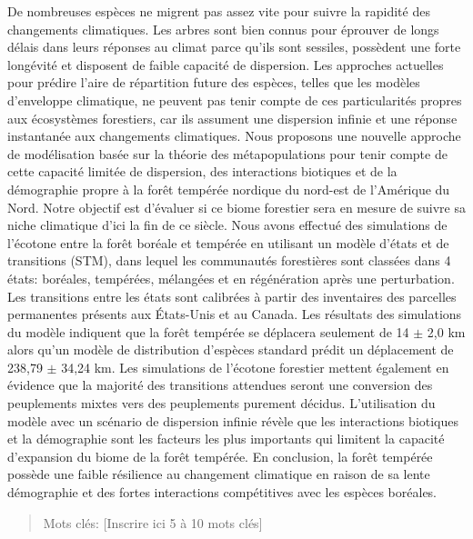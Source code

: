 \resume
\begin{singlespace}

  De nombreuses espèces ne migrent pas assez vite pour suivre la rapidité des changements
  climatiques. Les arbres sont bien connus pour éprouver de longs délais dans leurs réponses au
  climat parce qu'ils sont sessiles, possèdent une forte longévité et disposent de faible capacité
  de dispersion. Les approches actuelles pour prédire l'aire de répartition future des espèces,
  telles que les modèles d'enveloppe climatique, ne peuvent pas tenir compte de ces particularités
  propres aux écosystèmes forestiers, car ils assument une dispersion infinie et une réponse
  instantanée aux changements climatiques. Nous proposons une nouvelle approche de modélisation
  basée sur la théorie des métapopulations pour tenir compte de cette capacité limitée de
  dispersion, des interactions biotiques et de la démographie propre à la forêt tempérée nordique du
  nord-est de l'Amérique du Nord. Notre objectif est d'évaluer si ce biome forestier sera en mesure
  de suivre sa niche climatique d'ici la fin de ce siècle. Nous avons effectué des simulations de
  l'écotone entre la forêt boréale et tempérée en utilisant un modèle d'états et de transitions
  (STM), dans lequel les communautés forestières sont classées dans 4 états: boréales, tempérées,
  mélangées et en régénération après une perturbation. Les transitions entre les états sont
  calibrées à partir des inventaires des parcelles permanentes présents aux États-Unis et au Canada.
  Les résultats des simulations du modèle indiquent que la forêt tempérée se déplacera seulement de
  14 $\pm$ 2,0 km alors qu'un modèle de distribution d'espèces standard prédit un déplacement de
  238,79 $\pm$ 34,24 km. Les simulations de l'écotone forestier mettent également en évidence que la
  majorité des transitions attendues seront une conversion des peuplements mixtes vers des
  peuplements purement décidus. L'utilisation du modèle avec un scénario de dispersion infinie
  révèle que les interactions biotiques et la démographie sont les facteurs les plus importants qui
  limitent la capacité d'expansion du biome de la forêt tempérée. En conclusion, la forêt tempérée
  possède une faible résilience au changement climatique en raison de sa lente démographie et des
  fortes interactions compétitives avec les espèces boréales.


  \begin{quote}
    Mots clés: [Inscrire ici 5 à 10 mots clés]
  \end{quote}
\end{singlespace}
\cleardoublepage

